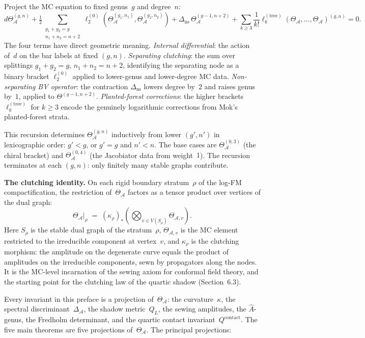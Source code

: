 \documentclass[11pt]{report}
\theoremstyle{definition}
\theoremstyle{remark}
\providecommand{\cA}{\mathcal{A}}
\numberwithin{equation}{section}
\begin{document}
Project the MC equation to fixed genus~$g$ and degree~$n$:
\[
d\Theta^{(g,n)}_\cA
+\tfrac12
\!\!\!
\sum_{\substack{g_1+g_2=g\\n_1+n_2=n+2}}
\!\!\!
\ell_2^{(0)}(\Theta^{(g_1,n_1)}_\cA,\Theta^{(g_2,n_2)}_\cA)
+\Delta_{\mathrm{ns}}\,\Theta^{(g-1,n+2)}_\cA
+\sum_{k\ge 3}\frac{1}{k!}
\ell_k^{(\mathrm{tree})}(\Theta_\cA,\dots,\Theta_\cA)^{(g,n)}
=0.
\]
The four terms have direct geometric meaning. \emph{Internal
differential}: the action of~$d$ on the bar labels at fixed
$(g,n)$. \emph{Separating clutching}: the sum over splittings
$g_1+g_2=g$, $n_1+n_2=n+2$, identifying the separating node as a
binary bracket $\ell_2^{(0)}$ applied to lower-genus and
lower-degree MC data. \emph{Non-separating BV operator}: the
contraction $\Delta_{\mathrm{ns}}$ lowers degree by~$2$ and raises
genus by~$1$, applied to $\Theta^{(g-1,n+2)}$.
\emph{Planted-forest corrections}: the higher brackets
$\ell_k^{(\mathrm{tree})}$ for $k\ge 3$ encode the genuinely
logarithmic corrections from Mok's planted-forest strata.

This recursion determines $\Theta^{(g,n)}_\cA$ inductively from
lower $(g',n')$ in lexicographic order: $g'<g$, or $g'=g$ and
$n'<n$. The base cases are
$\Theta^{(0,3)}_\cA$ (the chiral bracket) and
$\Theta^{(0,4)}_\cA$ (the Jacobiator data from weight~$1$).
The recursion terminates at each $(g,n)$: only finitely many stable
graphs contribute.

\medskip

\noindent\textbf{The clutching identity.}\enspace
On each rigid boundary stratum~$\rho$ of the log-FM
compactification, the restriction of~$\Theta_\cA$ factors as a
tensor product over vertices of the dual graph:
\[
\Theta_\cA\big|_\rho
\;=\;
(\kappa_\rho)_*\!\left(
\bigotimes_{v\in V(S_\rho)}\Theta_{\cA,v}
\right).
\]
Here $S_\rho$ is the stable dual graph of the stratum~$\rho$,
$\Theta_{\cA,v}$ is the MC element restricted to the irreducible
component at vertex~$v$, and $\kappa_\rho$ is the clutching
morphism: the amplitude on the degenerate curve equals the product
of amplitudes on the irreducible components, sewn by propagators
along the nodes. It is
the MC-level incarnation of the sewing axiom for conformal field
theory, and the starting point for the clutching law of the quartic
shadow (Section~6.3).

\bigskip
\noindent
Every invariant in this preface is a projection of~$\Theta_\cA$:
the curvature~$\kappa$, the spectral discriminant~$\Delta_\cA$,
the shadow metric~$Q_L$, the sewing amplitudes, the $\hat A$-genus,
the Fredholm determinant, and the quartic contact
invariant~$Q^{\mathrm{contact}}$.
The five main theorems are five projections of~$\Theta_\cA$.
The principal projections:
\end{document}

